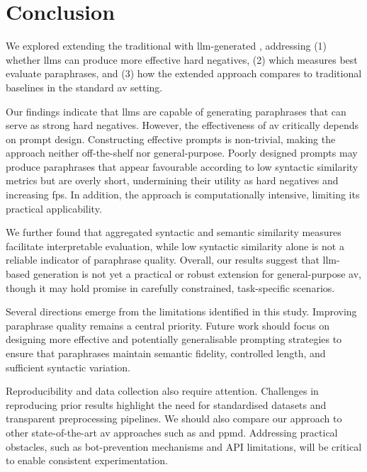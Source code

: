 \chapter{Conclusion}
\label{chap:conclusion}

We explored extending the traditional \impAppr{} with \ac{llm}-generated \imps{}, addressing (1) whether \acp{llm} can produce more effective hard negatives, (2) which measures best evaluate paraphrases, and (3) how the extended approach compares to traditional baselines in the standard \ac{av} setting.

Our findings indicate that \acp{llm} are capable of generating paraphrases that can serve as strong hard negatives. 
However, the effectiveness of \ac{av} critically depends on prompt design. 
Constructing effective prompts is non-trivial, making the approach neither off-the-shelf nor general-purpose. 
Poorly designed prompts may produce paraphrases that appear favourable according to low syntactic similarity metrics but are overly short, undermining their utility as hard negatives and increasing \acp{fp}. 
In addition, the approach is computationally intensive, limiting its practical applicability.  

We further found that aggregated syntactic and semantic similarity measures facilitate interpretable evaluation, while low syntactic similarity alone is not a reliable indicator of paraphrase quality. 
Overall, our results suggest that \ac{llm}-based \imp{} generation is not yet a practical or robust extension for general-purpose \ac{av}, though it may hold promise in carefully constrained, task-specific scenarios.  




Several directions emerge from the limitations identified in this study. 
Improving paraphrase quality remains a central priority. 
Future work should focus on designing more effective and potentially generalisable prompting strategies to ensure that paraphrases maintain semantic fidelity, controlled length, and sufficient syntactic variation.  

Reproducibility and data collection also require attention. 
Challenges in reproducing prior results highlight the need for standardised datasets and transparent preprocessing pipelines. 
We should also compare our approach to other state-of-the-art \ac{av} approaches such as \unmasking{} and \ac{ppmd}.
Addressing practical obstacles, such as bot-prevention mechanisms and API limitations, will be critical to enable consistent experimentation.  

